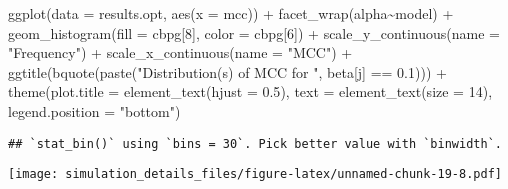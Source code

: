 \documentclass[
]{article}
\newenvironment{Shaded}{\begin{snugshade}}{\end{snugshade}}
\newcommand{\AttributeTok}[1]{\textcolor[rgb]{0.77,0.63,0.00}{#1}}
\newcommand{\DecValTok}[1]{\textcolor[rgb]{0.00,0.00,0.81}{#1}}
\newcommand{\FloatTok}[1]{\textcolor[rgb]{0.00,0.00,0.81}{#1}}
\newcommand{\FunctionTok}[1]{\textcolor[rgb]{0.00,0.00,0.00}{#1}}
\newcommand{\NormalTok}[1]{#1}
\newcommand{\SpecialCharTok}[1]{\textcolor[rgb]{0.00,0.00,0.00}{#1}}
\newcommand{\StringTok}[1]{\textcolor[rgb]{0.31,0.60,0.02}{#1}}
\begin{document}
\begin{Shaded}
\begin{Highlighting}[]
\FunctionTok{ggplot}\NormalTok{(}\AttributeTok{data =}\NormalTok{ results.opt,}
       \FunctionTok{aes}\NormalTok{(}\AttributeTok{x =}\NormalTok{ mcc)) }\SpecialCharTok{+}
  \FunctionTok{facet\_wrap}\NormalTok{(alpha}\SpecialCharTok{\textasciitilde{}}\NormalTok{model) }\SpecialCharTok{+}
  \FunctionTok{geom\_histogram}\NormalTok{(}\AttributeTok{fill =}\NormalTok{ cbpg[}\DecValTok{8}\NormalTok{], }\AttributeTok{color =}\NormalTok{ cbpg[}\DecValTok{6}\NormalTok{]) }\SpecialCharTok{+}
  \FunctionTok{scale\_y\_continuous}\NormalTok{(}\AttributeTok{name =} \StringTok{"Frequency"}\NormalTok{) }\SpecialCharTok{+}
  \FunctionTok{scale\_x\_continuous}\NormalTok{(}\AttributeTok{name =} \StringTok{"MCC"}\NormalTok{) }\SpecialCharTok{+}
  \FunctionTok{ggtitle}\NormalTok{(}\FunctionTok{bquote}\NormalTok{(}\FunctionTok{paste}\NormalTok{(}\StringTok{"Distribution(s) of MCC for "}\NormalTok{, beta[j] }\SpecialCharTok{==} \FloatTok{0.1}\NormalTok{))) }\SpecialCharTok{+}
  \FunctionTok{theme}\NormalTok{(}\AttributeTok{plot.title =} \FunctionTok{element\_text}\NormalTok{(}\AttributeTok{hjust =} \FloatTok{0.5}\NormalTok{), }
        \AttributeTok{text =} \FunctionTok{element\_text}\NormalTok{(}\AttributeTok{size =} \DecValTok{14}\NormalTok{),}
        \AttributeTok{legend.position =} \StringTok{"bottom"}\NormalTok{)}
\end{Highlighting}
\end{Shaded}

\begin{verbatim}
## `stat_bin()` using `bins = 30`. Pick better value with `binwidth`.
\end{verbatim}

\texttt{[image: simulation\_details\_files/figure-latex/unnamed-chunk-19-8.pdf]}
\end{document}
